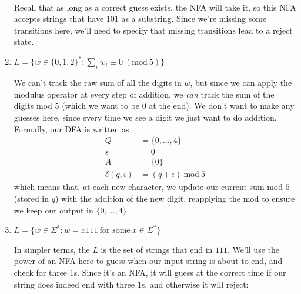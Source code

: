 \documentclass[fleqn]{article}
\begin{document}
\begin{enumerate}
\begin{answer}
 \\
        Recall that as long as a correct guess exists, the NFA will take it, so this NFA accepts strings that have $101$ as a substring. Since we're missing some transitions here, we'll need to specify that missing transitions lead to a reject state.
    \end{answer}
    \item $L = \{w \in \{0,1,2\}^* : \sum_{i}w_i \equiv 0~(\text{mod}~5)\}$
    \begin{answer}
        We can't track the raw sum of all the digits in $w$, but since we can apply the modulus operator at every step of addition, we \textit{can} track the sum of the digits mod $5$ (which we want to be $0$ at the end). We don't want to make any guesses here, since every time we see a digit we just want to do addition.
        Formally, our DFA is written as 
        \[
            \begin{aligned}
                Q &= \{0,\dots,4\} \\
                s &= 0 \\
                A &= \{0\} \\
                \delta(q, i) &= (q + i) ~\text{mod}~ 5
            \end{aligned}
        \]
        which means that, at each new character, we update our current sum mod $5$ (stored in $q$) with the addition of the new digit, reapplying the mod to ensure we keep our output in $\{0,\dots, 4\}$.
    \end{answer}
    \item $L = \{w \in \Sigma^* : w = x111~\text{for some}~x \in \Sigma^*\}$
    \begin{answer}
        In simpler terms, the $L$ is the set of strings that end in $111$. We'll use the power of an NFA here to guess when our input string is about to end, and check for three $1$s. Since it's an NFA, it will guess at the correct time if our string does indeed end with three $1$s, and otherwise it will reject:
\end{answer}
\end{enumerate}
\end{document}
